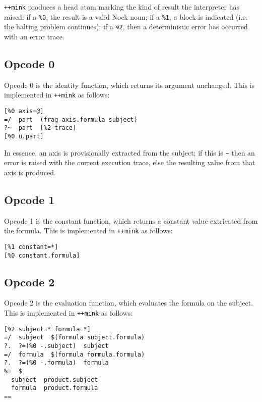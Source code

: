 \documentclass[twoside]{article}
\begin{document}
\lstinline[style=inlinecode]{++mink} produces a head atom marking the kind of result the interpreter has raised:  if a \lstinline[style=inlinecode]{%0}, the result is a valid Nock noun; if a \lstinline[style=inlinecode]{%1}, a block is indicated (i.e. the halting problem continues); if a \lstinline[style=inlinecode]{%2}, then a deterministic error has occurred with an error trace.

\subsection{Opcode 0}

Opcode 0 is the identity function, which returns its argument unchanged.  This is implemented in \lstinline[style=inlinecode]{++mink} as follows:

\begin{lstlisting}[style=listingcode]
  [%0 axis=@]
=/  part  (frag axis.formula subject)
?~  part  [%2 trace]
[%0 u.part]
\end{lstlisting}

\noindent
In essence, an axis is provisionally extracted from the subject; if this is \texttt{\textasciitilde} then an error is raised with the current execution trace, else the resulting value from that axis is produced.

\subsection{Opcode 1}

Opcode 1 is the constant function, which returns a constant value extricated from the formula.  This is implemented in \lstinline[style=inlinecode]{++mink} as follows:

\begin{lstlisting}[style=listingcode]
  [%1 constant=*]
[%0 constant.formula]
\end{lstlisting}

\subsection{Opcode 2}

Opcode 2 is the evaluation function, which evaluates the formula on the subject.  This is implemented in \lstinline[style=inlinecode]{++mink} as follows:

\begin{lstlisting}[style=listingcode]
  [%2 subject=* formula=*]
=/  subject  $(formula subject.formula)
?.  ?=(%0 -.subject)  subject
=/  formula  $(formula formula.formula)
?.  ?=(%0 -.formula)  formula
%=  $
  subject  product.subject
  formula  product.formula
==
\end{lstlisting}
\end{document}
